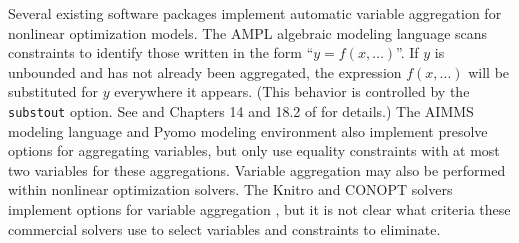\documentclass[smallextended]{svjour3}
\begin{document}
Several existing software packages implement automatic
variable aggregation for nonlinear optimization models.
The AMPL algebraic modeling language \cite{ampl} scans constraints to identify
those written in the form ``$y = f(x,\dots)$''.
If $y$ is unbounded and has not already been aggregated,
the expression $f(x,\dots)$ will be substituted for $y$ everywhere it appears.
(This behavior is controlled by the \texttt{substout} option.
See \cite{fourer1994} and Chapters 14 and 18.2 of \cite{ampl} for details.)
The AIMMS modeling language \cite{aimmsmanual} and Pyomo modeling environment
\cite{pyomobook,pyomopaper} also implement presolve options for aggregating
variables, but only use equality constraints with at most two variables for
these aggregations.
Variable aggregation may also be performed within nonlinear optimization solvers.
The Knitro \cite{knitro} and CONOPT \cite{conopt} solvers implement options
for variable aggregation \cite{knitromanual,conoptgamsmanual}, but it is not clear
what criteria these commercial solvers use to select variables and constraints
to eliminate.
\end{document}
